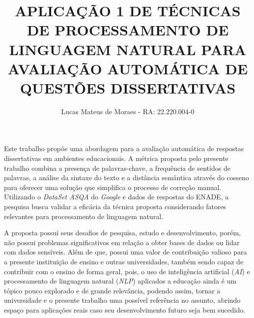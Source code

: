 \documentclass[acronym,symbols]{fei}
\author{
 Lucas Mateus de  Moraes - RA: 22.220.004-0
}
\title{APLICAÇÃO 1 DE TÉCNICAS DE PROCESSAMENTO DE LINGUAGEM NATURAL PARA AVALIAÇÃO AUTOMÁTICA DE QUESTÕES DISSERTATIVAS}
\begin{document}
\maketitle 

\begin{resumo}

Este trabalho propõe uma abordagem para a avaliação automática de respostas dissertativas em ambientes educacionais. A métrica proposta pelo presente trabalho combina a presença de palavras-chave, a frequência de sentidos de palavras, a análise da sintaxe do texto e a distância semântica através do cosseno para oferecer uma solução que simplifica o processo de correção manual. Utilizando o \textit{DataSet ASQA} do \textit{Google} e dados de respostas do ENADE, a pesquisa busca validar a eficácia da técnica proposta considerando fatores relevantes para processamento de linguagem natural.

A proposta possui seus desafios de pesquisa, estudo e desenvolvimento, porém, não possui problemas significativos em relação a obter bases de dados ou lidar com dados sensíveis. Além de que, possui uma valor de contribuição valioso para a presente instituição de ensino e outras universidades, também sendo capaz de contribuir com o ensino de forma geral, pois, o uso de inteligência artificial (\textit{AI}) e processamento de linguagem natural (\textit{NLP}) aplicados a educação ainda é um tópico pouco explorado e de grande relevância, podendo assim, tornar a universidade e o presente trabalho uma possível referência no assunto, abrindo espaço para aplicações reais caso seu desenvolvimento futuro seja bem sucedido.


\end{resumo}
\end{document}
